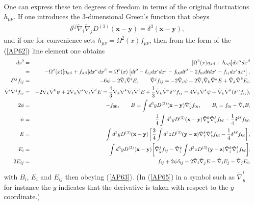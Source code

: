 \documentclass[aps]{revtex4}
\begin{document}
One can express these ten degrees of freedom in terms of the original fluctuations $h_{\mu\nu}$. If one introduces the 3-dimensional Green's function that obeys
%
\begin{eqnarray}
\delta^{ij}\tilde{\nabla}_i\tilde{\nabla}_jD^{(3)}(\mathbf{x}-\mathbf{y})=\delta^3(\mathbf{x}-\mathbf{y}),
\label{AP64}
\end{eqnarray}
%
and if one for convenience sets $h_{\mu\nu}=\Omega^2(x)f_{\mu\nu}$, then from the form of the (\ref{AP62}) line element one obtains 
%
\begin{eqnarray}
ds^2&=&-[\Omega^2(x)\eta_{\alpha\beta}+h_{\alpha\beta}]dx^{\alpha}dx^{\beta}
\nonumber\\
&=&-\Omega^2(x)[\eta_{\alpha\beta}+f_{\alpha\beta}]dx^{\alpha}dx^{\beta}=\Omega^2(x)\left[dt^2-\delta_{ij}dx^idx^j-f_{00}dt^2-2f_{0i}dtdx^i-f_{ij}dx^idx^j\right],
\nonumber\\
\delta^{ij}f_{ij}&=&-6\psi+2\tilde{\nabla}_i\tilde{\nabla}^iE,\qquad
 \tilde{\nabla}^jf_{ij}=-2\tilde{\nabla}_i\psi+2\tilde{\nabla}_i\tilde{\nabla}_k\tilde{\nabla}^kE+\tilde{\nabla}_k\tilde{\nabla}^kE_{i},
 \nonumber\\
 \tilde{\nabla}^i \tilde{\nabla}^jf_{ij}&=&-2\tilde{\nabla}_k\tilde{\nabla}^k\psi+2\tilde{\nabla}_k\tilde{\nabla}^k\tilde{\nabla}_{\ell}\tilde{\nabla}^{\ell}E=\frac{4}{3}\tilde{\nabla}_k\tilde{\nabla}^k\tilde{\nabla}_{\ell}\tilde{\nabla}^{\ell}E+\frac{1}{3}\tilde{\nabla}_k\tilde{\nabla}^k\delta^{ij}f_{ij}=4\tilde{\nabla}_k\tilde{\nabla}^k\psi+\tilde{\nabla}_k\tilde{\nabla}^k(\delta^{ij}f_{ij}),
 \nonumber\\
2\phi&=&-f_{00},\qquad
B=\int d^3yD^{(3)}(\mathbf{x}-\mathbf{y})\tilde{\nabla}_y^if_{0i},\qquad B_i=f_{0i}-\tilde{\nabla}_iB,
\nonumber\\
\psi&=&\frac{1}{4}\int d^3yD^{(3)}(\mathbf{x}-\mathbf{y})\tilde{\nabla}_y^k\tilde{\nabla}_y^{\ell}f_{k\ell}-\frac{1}{4}\delta^{k\ell}f_{k\ell},
\nonumber\\
\qquad
E&=&\int d^3yD^{(3)}(\mathbf{x}-\mathbf{y})\left[\frac{3}{4}\int d^3zD^{(3)}(\mathbf{y}-\mathbf{z})\tilde{\nabla}_z^k\tilde{\nabla}_z^{\ell}f_{k\ell}-\frac{1}{4}\delta^{k\ell}f_{k\ell}\right],
\nonumber\\
E_i&=&\int d^3yD^{(3)}(\mathbf{x}-\mathbf{y})\bigg{[}\tilde{\nabla}_y^jf_{ij}
-\tilde{\nabla}^y_i\int d^3zD^{(3)}(\mathbf{y}-\mathbf{z})\tilde{\nabla}_z^k\tilde{\nabla}_z^{\ell}f_{k\ell}\bigg{]},
\nonumber\\
2E_{ij}&=&f_{ij}+2\psi\delta_{ij} -2\tilde{\nabla}_i\tilde{\nabla}_j E - \tilde{\nabla}_i E_j - \tilde{\nabla}_j E_i, 
\label{AP65}
\end{eqnarray}
%
with $B_i$,  $E_i$ and $E_{ij}$ then obeying (\ref{AP63}). (In (\ref{AP65}) in a symbol such as $\tilde{\nabla}_y^i$ for instance the $y$ indicates that the derivative is taken with respect to the $y$ coordinate.) 
\end{document}
